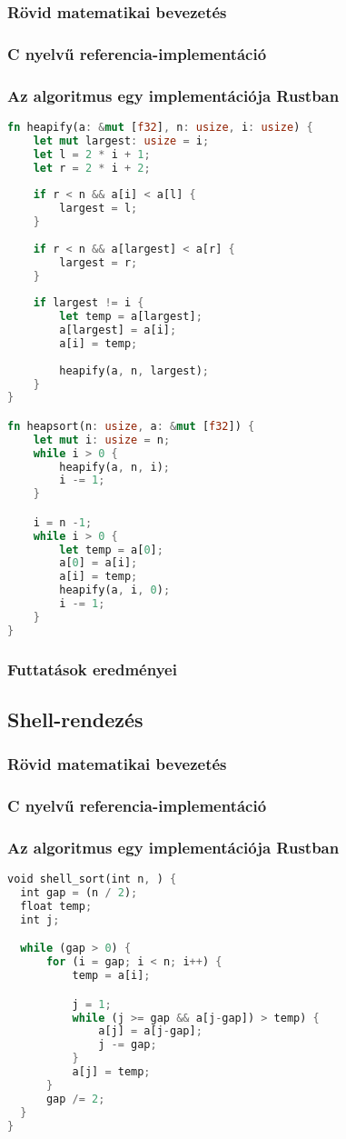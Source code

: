 \subsubsection{Rövid matematikai bevezetés}
\subsubsection{C nyelvű referencia-implementáció}
\subsubsection{Az algoritmus egy implementációja Rustban}
\begin{lstlisting}[language=Rust]
fn heapify(a: &mut [f32], n: usize, i: usize) {
	let mut largest: usize = i;
	let l = 2 * i + 1;
	let r = 2 * i + 2;
	
	if r < n && a[i] < a[l] {
		largest = l;
	}
	
	if r < n && a[largest] < a[r] {
		largest = r;
	}
	
	if largest != i {
		let temp = a[largest];
		a[largest] = a[i];
		a[i] = temp;
		
		heapify(a, n, largest);
	}
}

fn heapsort(n: usize, a: &mut [f32]) {
	let mut i: usize = n;
	while i > 0 {
		heapify(a, n, i);
		i -= 1;
	}

	i = n -1;
	while i > 0 {
		let temp = a[0];
		a[0] = a[i];
		a[i] = temp;
		heapify(a, i, 0);
		i -= 1;
	}
}
\end{lstlisting}
\subsubsection{Futtatások eredményei} %

\subsection{Shell-rendezés}
\subsubsection{Rövid matematikai bevezetés}
\subsubsection{C nyelvű referencia-implementáció}
\subsubsection{Az algoritmus egy implementációja Rustban}
\begin{lstlisting}[language=Rust]
void shell_sort(int n, ) {
  int gap = (n / 2);
  float temp;
  int j;

  while (gap > 0) {
      for (i = gap; i < n; i++) {
          temp = a[i];

          j = 1;
          while (j >= gap && a[j-gap]) > temp) {
              a[j] = a[j-gap];
              j -= gap;
          }
          a[j] = temp;
      }
      gap /= 2;
  }
}



\end{lstlisting}
